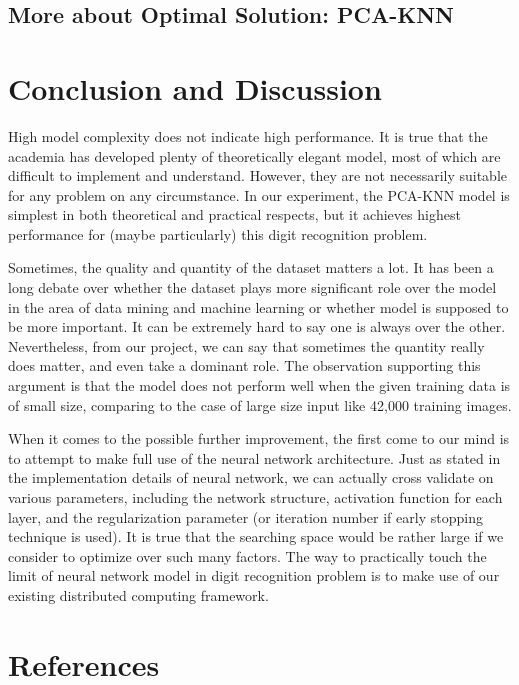 \documentclass{article} %
\begin{document}
\subsection{More about Optimal Solution: PCA-KNN}
\section{Conclusion and Discussion} \label{Conclu}

High model complexity does not indicate high performance. It is true that the academia
has developed plenty of theoretically elegant model, most of which are
difficult to implement and understand. However, they are not necessarily suitable
for any problem on any circumstance. In our experiment, the PCA-KNN model is
simplest in both theoretical and practical respects, but it achieves highest
performance for (maybe particularly) this digit recognition problem.

Sometimes, the quality and quantity of the dataset matters a lot. It has been
a long debate over whether the dataset plays more significant role over the
model in the area of data mining and machine learning or whether model is
supposed to be more important. It can be extremely hard to say one is always
over the other. Nevertheless, from our project, we can say that sometimes the
quantity really does matter, and even take a dominant role. The observation
supporting this argument is that the \knn model does not perform well when the
given training data is of small size, comparing to the case of large size
input like 42,000 training images.  


When it comes to the possible further improvement, the first come to our mind
is to attempt to make full use of the neural network architecture. Just as
stated in the implementation details of neural network, we can actually cross
validate on various parameters, including the network structure, activation
function for each layer, and the regularization parameter (or iteration number
if early stopping technique is used). It is true that the searching space
would be rather large if we consider to optimize over such many factors. The
way to practically touch the limit of neural network model in digit
recognition problem is to make use of our existing distributed computing
framework.

\section{References}
\end{document}

